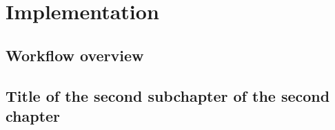\chapter{Implementation}

\section{Workflow overview}

\section{Title of the second subchapter of the second chapter}
